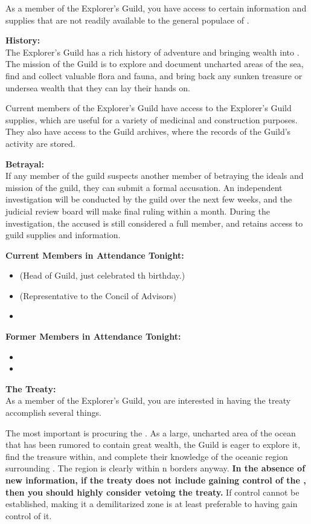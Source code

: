 \documentclass[blue]{NeptuneBall}
\begin{document}
\name{\bExplorer{}}

As a member of the Explorer's Guild, you have access to certain information and supplies that are not readily available to the general populace of \pAtlantis{}.

{\bf History:}\\
The Explorer's Guild has a rich history of adventure and bringing wealth into \pAtlantis{}. The mission of the Guild is to explore and document uncharted areas of the sea, find and collect valuable flora and fauna, and bring back any sunken treasure or undersea wealth that they can lay their hands on.

Current members of the Explorer's Guild have access to the Explorer's Guild supplies, which are useful for a variety of medicinal and construction purposes. They also have access to the Guild archives, where the records of the Guild's activity are stored. 

{\bf Betrayal:}\\
If any member of the guild suspects another member of betraying the ideals and mission of the guild, they can submit a formal accusation. An independent investigation will be conducted by the guild over the next few weeks, and the judicial review board will make final ruling within a month. During the investigation, the accused is still considered a full member, and retains access to guild supplies and information.

{\bf Current Members in Attendance Tonight:}
\begin{itemize}
\item \cPlant{} (Head of Guild, just celebrated \cPlant{\their} \cOsiris{\MYnumber}th birthday.)
\item \cPriest{} (Representative to the Concil of Advisors)
\item \cPrincess{}
\end{itemize}

{\bf Former Members in Attendance Tonight:}
\begin{itemize}
\item \cAriel{}
\item \cKing{}
\end{itemize}

{\bf The Treaty:}\\
As a member of the Explorer's Guild, you are interested in having the treaty accomplish several things. 

The most important is procuring the \pGazaStrip{}. As a large, uncharted area of the ocean that has been rumored to contain great wealth, the Guild is eager to explore it, find the treasure within, and complete their knowledge of the oceanic region surrounding \pAtlantis{}. The region is clearly within \pAtlantis{}n borders anyway. {\bf In the absence of new information, if the treaty does not include \pAtlantis{} gaining control of the \pGazaStrip{}, then you should highly consider vetoing the treaty.} If control cannot be established, making it a demilitarized zone is at least preferable to having \pPacifica{} gain control of it.
\end{document}
